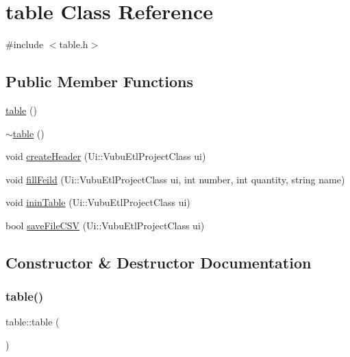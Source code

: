 \hypertarget{classtable}{}\section{table Class Reference}
\label{classtable}


{\ttfamily \#include $<$table.\+h$>$}

\subsection*{Public Member Functions}
\begin{DoxyCompactItemize}
\item 
\mbox{\hyperlink{classtable_abba3ea52658e29d833ed1bcb2a5b7cc4}{table}} ()
\item 
\mbox{\hyperlink{classtable_a314d9cf6ee35be9ac221982599a57d8d}{$\sim$table}} ()
\item 
void \mbox{\hyperlink{classtable_a213677998aaa570d8fd3fed63a09a220}{create\+Header}} (Ui\+::\+Vubu\+Etl\+Project\+Class ui)
\item 
void \mbox{\hyperlink{classtable_a83db8b2cf00d0ca0ecd1f24afd74e5e0}{fill\+Feild}} (Ui\+::\+Vubu\+Etl\+Project\+Class ui, int number, int quantity, string name)
\item 
void \mbox{\hyperlink{classtable_a292da44d8d57516c961a0231b7d468fb}{inin\+Table}} (Ui\+::\+Vubu\+Etl\+Project\+Class ui)
\item 
bool \mbox{\hyperlink{classtable_a1454b28e9718a5bab04ad5b98965432c}{save\+File\+C\+SV}} (Ui\+::\+Vubu\+Etl\+Project\+Class ui)
\end{DoxyCompactItemize}


\subsection{Constructor \& Destructor Documentation}
\mbox{\label{classtable_abba3ea52658e29d833ed1bcb2a5b7cc4}} 
\subsubsection{\texorpdfstring{table()}{table()}}
{\footnotesize\ttfamily table\+::table (\begin{DoxyParamCaption}{ }\end{DoxyParamCaption})}

\mbox{\label{classtable_a314d9cf6ee35be9ac221982599a57d8d}} 

